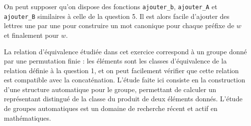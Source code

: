 

\Q
On peut supposer qu'on dispose des fonctions \texttt{ajouter\_b}, \texttt{ajouter\_A} et \texttt{ajouter\_B} similaires à celle de la question 5. Il est alors facile d'ajouter des lettres une par une pour construire un mot canonique pour chaque préfixe de $w$ et finalement pour $w$.


\medskip

La relation d'équivalence étudiée dans cet exercice correspond à un groupe donné par une permutation finie : les éléments sont les classes d'équivalence de la relation définie à la question 1, et on peut facilement vérifier que cette relation est compatible avec la concaténation. L'étude faite ici consiste en la construction d'une \og structure automatique \fg{} pour le groupe, permettant de calculer un représentant distingué de la classe du produit de deux éléments donnés. L'étude de groupes automatiques est un domaine de recherche récent et actif en mathématiques.
\bigskip

\Fin
